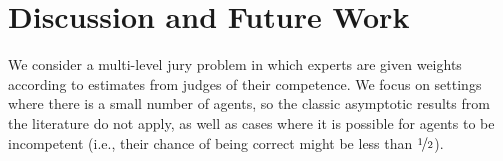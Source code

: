 \documentclass[letterpaper]{article} %
\begin{document}

\section{Discussion and Future Work}
We consider a multi-level jury problem in which experts are given weights according to estimates from judges of their competence. We focus on settings where there is a small number of agents, so the classic asymptotic results from the literature do not apply, as well as cases where it is possible for agents to be incompetent (i.e., their chance of being correct might be less than $\nicefrac{1}{2}$).
\end{document}
